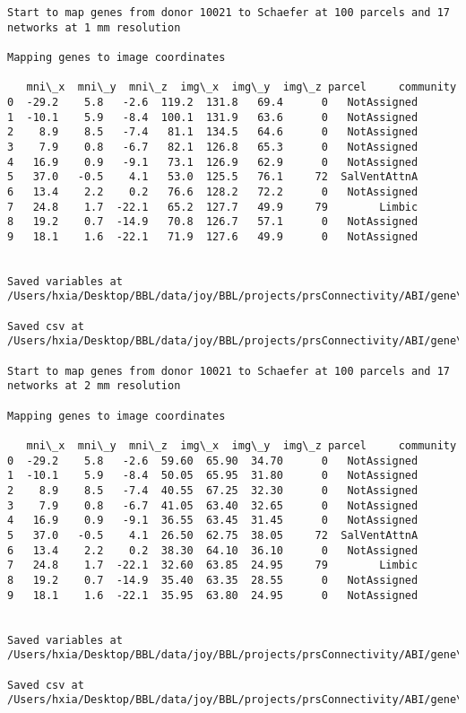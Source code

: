 \documentclass[11pt]{article}
\begin{document}
\begin{Verbatim}[commandchars=\\\{\}]
Start to map genes from donor 10021 to Schaefer at 100 parcels and 17 networks at 1 mm resolution

Mapping genes to image coordinates

   mni\_x  mni\_y  mni\_z  img\_x  img\_y  img\_z parcel     community
0  -29.2    5.8   -2.6  119.2  131.8   69.4      0   NotAssigned
1  -10.1    5.9   -8.4  100.1  131.9   63.6      0   NotAssigned
2    8.9    8.5   -7.4   81.1  134.5   64.6      0   NotAssigned
3    7.9    0.8   -6.7   82.1  126.8   65.3      0   NotAssigned
4   16.9    0.9   -9.1   73.1  126.9   62.9      0   NotAssigned
5   37.0   -0.5    4.1   53.0  125.5   76.1     72  SalVentAttnA
6   13.4    2.2    0.2   76.6  128.2   72.2      0   NotAssigned
7   24.8    1.7  -22.1   65.2  127.7   49.9     79        Limbic
8   19.2    0.7  -14.9   70.8  126.7   57.1      0   NotAssigned
9   18.1    1.6  -22.1   71.9  127.6   49.9      0   NotAssigned


Saved variables at /Users/hxia/Desktop/BBL/data/joy/BBL/projects/prsConnectivity/ABI/gene\_mapping/10021donor\_100Parcels\_17Network\_1mm.pkl

Saved csv at /Users/hxia/Desktop/BBL/data/joy/BBL/projects/prsConnectivity/ABI/gene\_mapping/10021donor\_100Parcels\_17Network\_1mm.csv

Start to map genes from donor 10021 to Schaefer at 100 parcels and 17 networks at 2 mm resolution

Mapping genes to image coordinates

   mni\_x  mni\_y  mni\_z  img\_x  img\_y  img\_z parcel     community
0  -29.2    5.8   -2.6  59.60  65.90  34.70      0   NotAssigned
1  -10.1    5.9   -8.4  50.05  65.95  31.80      0   NotAssigned
2    8.9    8.5   -7.4  40.55  67.25  32.30      0   NotAssigned
3    7.9    0.8   -6.7  41.05  63.40  32.65      0   NotAssigned
4   16.9    0.9   -9.1  36.55  63.45  31.45      0   NotAssigned
5   37.0   -0.5    4.1  26.50  62.75  38.05     72  SalVentAttnA
6   13.4    2.2    0.2  38.30  64.10  36.10      0   NotAssigned
7   24.8    1.7  -22.1  32.60  63.85  24.95     79        Limbic
8   19.2    0.7  -14.9  35.40  63.35  28.55      0   NotAssigned
9   18.1    1.6  -22.1  35.95  63.80  24.95      0   NotAssigned


Saved variables at /Users/hxia/Desktop/BBL/data/joy/BBL/projects/prsConnectivity/ABI/gene\_mapping/10021donor\_100Parcels\_17Network\_2mm.pkl

Saved csv at /Users/hxia/Desktop/BBL/data/joy/BBL/projects/prsConnectivity/ABI/gene\_mapping/10021donor\_100Parcels\_17Network\_2mm.csv


\end{Verbatim}
\end{document}
